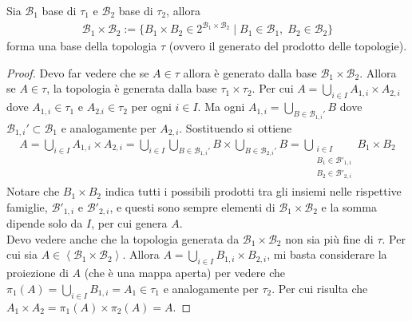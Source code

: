 \begin{theorem}
	Sia $\mathcal{B}_1$ base di $\tau_1$ e $\mathcal{B_2}$ base di $\tau_2$, allora
	\begin{equation}
	\begin{aligned}	
		\mathcal{B}_1 \times \mathcal{B}_2 := \{B_1 \times B_2 \in 2^{\mathcal{B}_1 \times \mathcal{B}_2} \; | \; B_1 \in \mathcal{B}_1, \; B_2 \in \mathcal{B}_2\}
	\end{aligned}
	\end{equation}
	forma una base della topologia $\tau$ (ovvero il generato del prodotto delle topologie).
\end{theorem}
\begin{proof}
	Devo far vedere che se $A \in \tau$ allora è generato dalla base $\mathcal{B}_1 \times \mathcal{B}_2$. Allora se $A \in \tau$, la topologia è generata dalla base $\tau_1 \times \tau_2$. Per cui $A = \bigcup_{i \in I} A_{1,i} \times A_{2,i}$ dove $A_{1,i} \in \tau_1$ e $A_{2.i} \in \tau_2$ per ogni $i \in I$. Ma ogni $A_{1, i} = \bigcup_{B \in \mathcal{B}_{1,i}'} B$ dove $\mathcal{B}_{1,i}' \subset \mathcal{B}_1$ e analogamente per $A_{2,i}$. Sostituendo si ottiene
	\begin{equation}
	\begin{aligned}
		A = \bigcup_{i \in I} A_{1,i} \times A_{2,i} = \bigcup_{i \in I} \bigcup_{B \in \mathcal{B}_{1,i}'} B \times \bigcup_{B \in \mathcal{B}_{2,i}'} B = \bigcup_{\substack{i \in I \\ B_1 \in \mathcal{B}'_{1,i} \\ B_2 \in \mathcal{B}'_{2,i}}} B_1 \times B_2
	\end{aligned}
	\end{equation}
	Notare che $B_1 \times B_2$ indica tutti i possibili prodotti tra gli insiemi nelle rispettive famiglie, $\mathcal{B}'_{1,i}$ e $\mathcal{B}'_{2,i}$, e questi sono sempre elementi di $\mathcal{B}_1 \times \mathcal{B}_2$ e la somma dipende solo da $I$, per cui genera $A$. \\
	
	Devo vedere anche che la topologia generata da $\mathcal{B}_1 \times \mathcal{B}_2$ non sia più fine di $\tau$. Per cui sia $A \in \left\langle \mathcal{B}_1 \times \mathcal{B}_2 \right\rangle$. Allora $A = \bigcup_{i \in I} B_{1,i} \times B_{2,i}$, mi basta considerare la proiezione di $A$ (che è una mappa aperta) per vedere che $\pi_1(A) = \bigcup_{i \in I} B_{1,i} = A_1 \in \tau_1$ e analogamente per $\tau_2$. Per cui risulta che $A_1 \times A_2 = \pi_1(A) \times \pi_2(A) = A$.
\end{proof}



